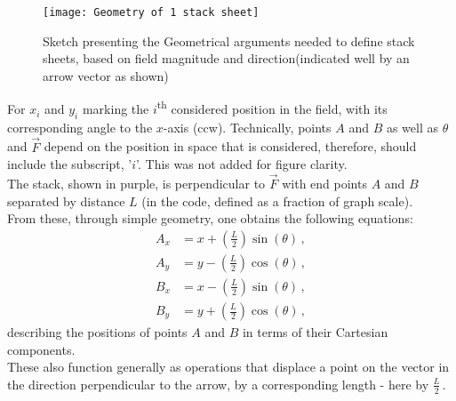 \documentclass[11]{report}
\begin{document}
\begin{figure}[H]
	\centering
	\graphicspath{ {c:/Users/macus/Desktop/Uni/summer internships/Moustafa - Differential Forms/images/} }
	\texttt{[image: Geometry of 1 stack sheet]}
	\caption{Sketch presenting the Geometrical arguments needed to define stack sheets, based on field magnitude and direction(indicated well by an arrow vector as shown)}
	\label{fig:1 sheet}
\end{figure}
\noindent For \( x_i\) and \( y_i\) marking the $i$\textsuperscript{th}  considered position in the field, with its corresponding angle to the $x$-axis (ccw). Technically, points \(A\) and \(B\) as well as $\theta$ and $\vec F$ depend on the position in space that is considered, therefore, should include the subscript, '\(i \)'. This was not added for figure clarity. \\
The stack, shown in purple, is perpendicular to $\vec F$  with end points $A$ and $B$ separated by distance $L$ (in the code, defined as a fraction of graph scale).\\
From these, through simple geometry, one obtains the following equations:
\begin{equation}
\label{T1} \begin{split}
A_x &= x + \left( \frac{L}{2} \right) \sin( \theta)\,,\\
A_y &= y - \left( \frac{L}{2} \right) \cos( \theta)\,,\\
B_x &= x - \left( \frac{L}{2} \right) \sin( \theta)\,,\\
B_y &= y + \left( \frac{L}{2} \right) \cos( \theta)\,,
\end{split}
\end{equation}
describing the positions of points \(A\) and \(B\) in terms of their Cartesian components.\\
These also function generally as operations that displace a point on the vector in the direction perpendicular to the arrow, by a corresponding length - here by \( \frac{L}{2} \)\,. \\
\end{document}
